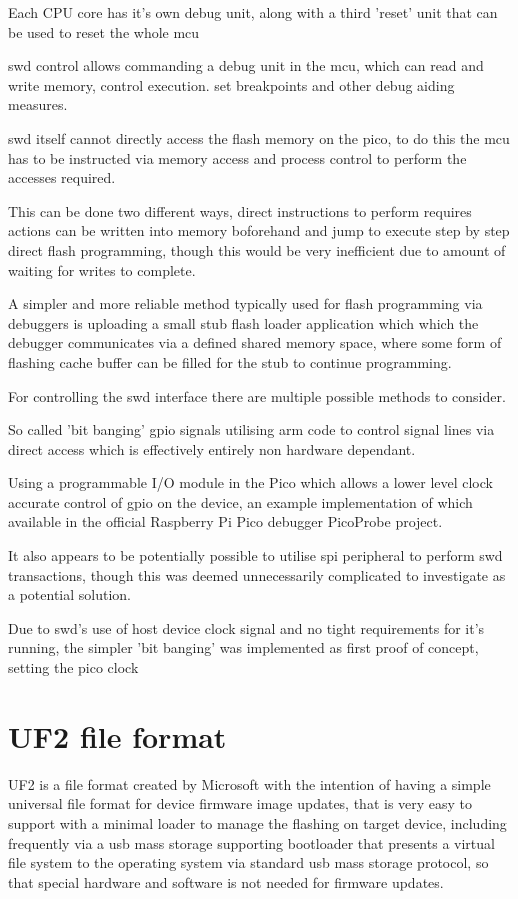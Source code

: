 Each CPU core has it's own debug unit, along with a third 'reset' unit that can be used to reset the whole \gls{mcu}

\gls{swd}  control allows commanding a debug unit in the \gls{mcu}, which can read and write memory, control execution. set breakpoints and other debug aiding measures.

\gls{swd} itself cannot directly access the flash memory on the pico, to do this the \gls{mcu} has to be instructed via memory access and process control to perform the accesses required.

This can be done two different ways, direct instructions to perform requires actions can be written into memory
boforehand and jump to execute step by step direct flash programming, though this would be very inefficient due to amount of waiting for writes to complete.

A simpler and more reliable method typically used for flash programming via debuggers is uploading a small stub flash loader application which which the debugger communicates via a defined shared memory space, where some form of flashing cache buffer can be filled for the stub to continue programming.

For controlling the \gls{swd} interface there are multiple possible methods to consider. 

So called 'bit banging' \gls{gpio} signals utilising \gls{arm} code to control signal lines via direct access which is effectively entirely non hardware dependant.

Using a programmable I/O module in the Pico which allows a lower level clock accurate control of \gls{gpio} on the device, an example implementation of which available in the official Raspberry Pi Pico debugger PicoProbe\cite{Picoprobe2023} project.

It also appears to be potentially possible to utilise \gls{spi} peripheral to perform \gls{swd} transactions, though this was deemed unnecessarily complicated to investigate as a potential solution\cite{OpenOCDRaspberryPi}.

Due to \gls{swd}'s use of host device clock signal and no tight requirements for it's running, the simpler 'bit banging' was implemented as first proof of concept, setting the pico clock
\clearpage
\section{UF2 file format}
UF2 is a file format created by Microsoft with the intention of having a simple universal file format for device firmware image updates, that is very easy to support with a minimal loader to manage the flashing on target device, including frequently via a \gls{usb} mass storage supporting bootloader that presents a virtual file system to the operating system via standard \gls{usb} mass storage protocol, so that special hardware and software is not needed for firmware updates.

